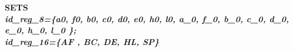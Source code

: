 \documentclass[a4paper]{llncs}
\begin{document}
\begin{sloppypar}

\bf SETS\\
\hspace*{0.10in}\it id\_reg\_8\rm =\rm \{\it a0\rm, \it f0\rm, \it b0\rm, \it
c0\rm, \it d0\rm, \it e0\rm, \it h0\rm, \it l0\rm, \it a\_0\rm,  \it f\_0\rm,
\it b\_0\rm, \it c\_0\rm, \it d\_0\rm, \it e\_0\rm, \it h\_0\rm, \it l\_0 \rm
\};\\ \hspace*{0.10in}\it id\_reg\_16\rm =\rm \{\it AF \rm, \it BC\rm, \it
DE\rm, \it HL\rm, \it SP\rm\}
	

\end{sloppypar}

%
\end{document}
